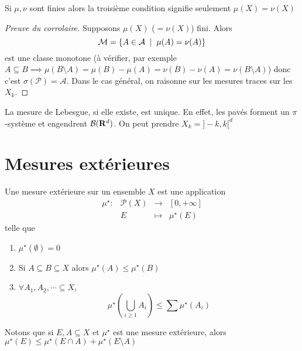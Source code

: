 \begin{rem}
    Si $\mu, \nu$ sont finies alors la troisième condition signifie seulement  $\mu(X)=\nu(X)$
\end{rem}

\begin{proof}[Preuve du corrolaire]
    Supposons $\mu(X)$ ($=\nu(X)$) fini. Alors \[
        \mathcal  M= \left\{ A \in  \mathcal  A \;\suchthat\; \mu(A)=\nu(A) \right\} 
    \] 
    est une classe monotone (à vérifier, par exemple $A\subseteq B\implies \mu(B \setminus  A)=\mu(B)-\mu(A)=\nu(B)-\nu(A)=\nu(B \setminus  A)$) donc c'est $\sigma(\mathcal P)=\mathcal  A$. Dans le cas général, on raisonne sur les mesures traces sur les $X_k$.
\end{proof}

\begin{ex}
    La mesure de Lebesgue, si elle existe, est unique. En effet, les pavés forment un $\pi$-système et engendrent  $\mathcal  B(\mathbf R^d)$. On peut prendre $X_k=]-k,k[^d$
\end{ex}

\section{Mesures extérieures}

\begin{dfn}
    Une mesure extérieure sur un ensemble $X$ est une application  \[
    \begin{array}{rrcl}
        \mu^\star:& \mathcal  P(X) & \longrightarrow &[0, +\infty]  \\
         & E & \longmapsto & \displaystyle \mu^\star(E)
    \end{array}
    \]
    telle que \begin{enumerate}
        \item $\mu^\star(\emptyset)=0$
        \item Si  $A\subseteq B\subseteq X$ alors $\mu^\star(A) \leq \mu^\star (B)$
        \item $\forall  A_1, A_2, \cdots \subseteq X$, \[
                \mu^\star \left(\bigcup_{i\geq 1}A_i\right) \leq \sum \mu^\star(A_i)
        \]
    \end{enumerate}
\end{dfn}

\begin{rem}
    Notons que si $E, A\subseteq X$ et $\mu^\star$ est une mesure extérieure, alors  $\mu^\star(E)\leq \mu^\star(E\cap A)+\mu^\star(E \setminus  A)$
\end{rem}

